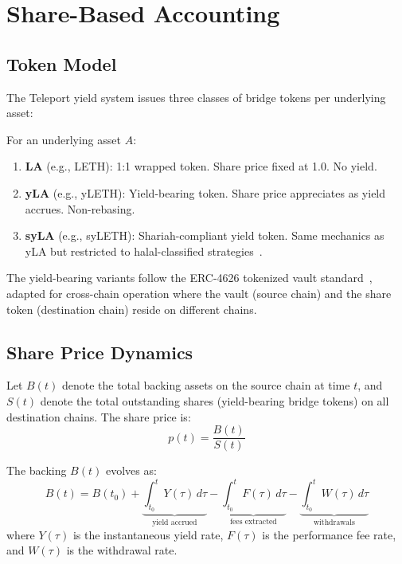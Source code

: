 \section{Share-Based Accounting}
\label{sec:share}

\subsection{Token Model}

The Teleport yield system issues three classes of bridge tokens per underlying asset:

\begin{definition}
For an underlying asset $A$:
\begin{enumerate}[nosep]
  \item \textbf{LA} (e.g., LETH): 1:1 wrapped token. Share price fixed at 1.0. No yield.
  \item \textbf{yLA} (e.g., yLETH): Yield-bearing token. Share price appreciates as yield accrues. Non-rebasing.
  \item \textbf{syLA} (e.g., syLETH): Shariah-compliant yield token. Same mechanics as yLA but restricted to halal-classified strategies~\cite{luxteleport}.
\end{enumerate}
\end{definition}

The yield-bearing variants follow the ERC-4626 tokenized vault standard~\cite{erc4626}, adapted for cross-chain operation where the vault (source chain) and the share token (destination chain) reside on different chains.

\subsection{Share Price Dynamics}

\begin{definition}
Let $B(t)$ denote the total backing assets on the source chain at time $t$, and $S(t)$ denote the total outstanding shares (yield-bearing bridge tokens) on all destination chains. The share price is:
\begin{equation}\label{eq:shareprice}
  p(t) = \frac{B(t)}{S(t)}
\end{equation}
\end{definition}

The backing $B(t)$ evolves as:
\begin{equation}\label{eq:backing}
  B(t) = B(t_0) + \underbrace{\int_{t_0}^{t} Y(\tau)\,d\tau}_{\text{yield accrued}} - \underbrace{\int_{t_0}^{t} F(\tau)\,d\tau}_{\text{fees extracted}} - \underbrace{\int_{t_0}^{t} W(\tau)\,d\tau}_{\text{withdrawals}}
\end{equation}
where $Y(\tau)$ is the instantaneous yield rate, $F(\tau)$ is the performance fee rate, and $W(\tau)$ is the withdrawal rate.

